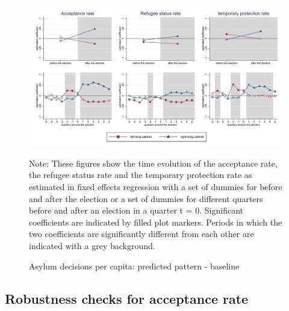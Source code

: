 \documentclass[11pt,a4paper]{scrartcl}
\begin{document}
\clearpage
\FloatBarrier
\begin{figure}[!ht]
	\caption{Asylum decisions per capita: predicted pattern - baseline}
	\centering
	\begin{minipage}{1\textwidth} 
		\includegraphics[width=\linewidth]{../results/decisions/dec_graphs_baseline.pdf}
		{\scriptsize Note: These figures show the time evolution of the acceptance rate, the refugee status rate and the temporary protection rate as estimated in fixed effects regression with a set of dummies for before and after the election or a set of dummies for different quarters before and after an election in a quarter t = 0. Significant coefficients are indicated by filled plot markers. Periods in which the two coefficients are significantly different from each other are indicated with a grey background. \par}
	\end{minipage}
\end{figure}






\clearpage
\FloatBarrier
\subsection{Robustness checks for acceptance rate}


\end{document}
